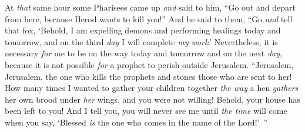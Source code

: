 \begin{biblechapter}
 At \textit{that} same hour some Pharisees came up \textit{and} said to him, “Go out and depart from here, because Herod wants to kill you!”
\verse And he said to them, “Go \textit{and} tell that fox, ‘Behold, I am expelling demons and performing healings today and tomorrow, and on the third \textit{day} I will complete \textit{my work}.’
\verse Nevertheless, it is necessary \textit{for} me to be on the way today and tomorrow and on the next \textit{day}, because it is not possible \textit{for} a prophet to perish outside Jerusalem.
\verse “Jerusalem, Jerusalem, the one who kills the prophets and stones those who are sent to her! How many times I wanted to gather your children together \textit{the way} a hen \textit{gathers} her own brood under \textit{her} wings, and you were not willing!
\verse Behold, your house has been left to you! And I tell you, you will never see me until \textit{the time} will come when you say, ‘Blessed \textit{is} the one who comes in the name of the Lord!’ ”
\end{biblechapter}

